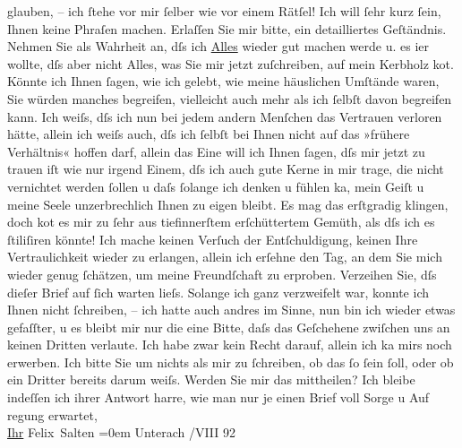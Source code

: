 \begin{ledgroupsized}[t]{13cm}
               glauben, – ich ſtehe vor mir ſelber wie vor einem Rätſel! Ich will ſehr kurz ſein,
               Ihnen keine Phraſen machen. Erlaſſen Sie mir bitte, ein detailliertes Geſtänd{\pb}nis. Nehmen Sie als
               Wahrheit an, dſs ich \uline{Alles} wieder gut machen werde u.
               es i{\geminationm}er wollte, dſs aber nicht Alles, was Sie mir jetzt
               zuſchreiben, auf mein Kerbholz ko{\geminationm}t. Könnte ich Ihnen
               ſagen, wie ich gelebt, wie meine häuslichen Umſtände waren, Sie würden manches
               begreifen, vielleicht auch mehr als ich ſelbſt davon begreifen kann. \pend
           \pstart
           Ich weiſs, dſs ich nun bei jedem andern Menſchen das Vertrauen verloren hätte, allein
               ich weiſs auch, dſs ich ſelbſt bei Ihnen nicht {\pb}auf das »frühere Verhältnis«
               hoffen darf, allein das Eine will ich Ihnen ſagen, dſs mir jetzt zu trauen iſt wie
               nur irgend Einem, dſs ich auch gute Kerne in mir trage, die nicht vernichtet werden
               ſollen u daſs ſolange ich denken u fühlen ka{\geminationn}, mein
               Geiſt u meine Seele unzerbrechlich Ihnen zu eigen bleibt. \pend
           \pstart
           Es mag das erſtgradig klingen, doch ko{\geminationm}t es mir zu ſehr
               aus tiefinnerſtem erſchüttertem Gemüth, als dſs ich es ſtiliſiren könnte! \pend
           \pstart
           Ich mache keinen Verſuch der Entſchuldigung, keinen Ihre Vertraulichkeit wieder zu
                  er{\pb}langen, allein ich
               erſehne den Tag, an dem Sie mich wieder genug ſchätzen, um meine Freundſchaft zu
               erproben. \pend
           \pstart
           Verzeihen Sie, dſs dieſer Brief auf ſich warten lieſs. Solange ich ganz verzweifelt
               war, konnte ich Ihnen nicht ſchreiben, – ich hatte auch andres im Sinne, nun bin ich
               wieder etwas gefaſſter, u es bleibt mir nur die eine Bitte, daſs das Geſchehene
               zwiſchen uns an keinen Dritten verlaute. Ich habe zwar kein Recht darauf, allein ich
                  ka{\geminationn} mirs noch erwerben. Ich bitte Sie um nichts als
               mir zu ſchreiben, ob das ſo ſein ſoll, oder ob ein {\pb}Dritter bereits darum
               weiſs.\pend
           \pstart
           Werden Sie mir das mittheilen? \pend
           \pstart
           Ich bleibe indeſſen ich ihrer Antwort harre, wie man nur je einen Brief voll
               Sorge u Auf regung erwartet, {\\[\baselineskip]}\uline{Ihr}{ }\spacefill\mbox{Felix Salten}\pend
           \leftskip=0em{}\pstart
           \noindent{}Unterach \pend
           /VIII 92\pend
           
         
         \endnumbering{}\end{ledgroupsized}\begin{anhang}\end{anhang}\newcommand{\dateiname}{L03112}\newcommand{\titel}{Felix Salten an Arthur Schnitzler, [17. 8. 1892]}\newcommand{\editorInnen}{Martin Anton Müller und Laura Untner}
      